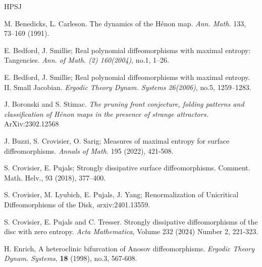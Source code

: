\documentclass[a4paper,11pt]{article}
\theoremstyle{definition}
\begin{document}
\begin{thebibliography}{HPSJ}

{\footnotesize \setlength{\parskip}{.001in}



 M. Benedicks, L. Carleson. The dynamics of the H\'enon map. {\em Ann. Math.} 133, 73–169 (1991).



 E. Bedford, J. Smillie;
Real polynomial diffeomorphisms with maximal entropy: Tangencies.
{\em Ann. of Math. (2) 160(2004)}, no.1, 1–26.

  E. Bedford, J. Smillie;
Real polynomial diffeomorphisms with maximal entropy. II. Small Jacobian.   {\it Ergodic Theory Dynam. Systems 26(2006)}, no.5, 1259–1283.

J. Boronski and S. Stimac.
{\it The pruning front conjecture, folding patterns and classification of Hénon maps in the presence of strange attractors.}
ArXiv:2302.12568



 J. Buzzi, S. Crovisier, O. Sarig; 
Measures of maximal entropy for surface diffeomorphisms. {\em Annals of Math.} 195 (2022), 421-508.



 S. Crovisier, E. Pujals; Strongly dissipative surface diffeomorphisms. Comment. Math. Helv., 93 (2018), 377–400.



S. Crovisier, M. Lyubich, E. Pujals, J. Yang; Renormalization of Unicritical Diffeomorphisms of the Disk, {\emph arxiv:2401.13559.}



 S. Crovisier, E. Pujals and C. Tresser.
Strongly dissipative diffeomorphisms of the disc with zero entropy. \emph{Acta Mathematica}, Volume 232 (2024) Number 2, 221-323.


 H. Enrich, 
A heteroclinic bifurcation of Anosov diffeomorphisms.
\emph{Ergodic Theory Dynam. Systems}, {\bf 18} (1998), no.3, 567-608.

}
\end{thebibliography}
\end{document}
